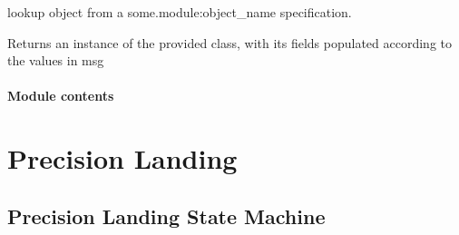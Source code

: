 \documentclass[letterpaper,10pt,english]{sphinxmanual}
\begin{document}

\begin{fulllineitems}
\label{\detokenize{source/mqtt_bridge/mqtt_bridge:mqtt_bridge.util.lookup_object}}
lookup object from a some.module:object\_name specification.

\end{fulllineitems}


\begin{fulllineitems}
\label{\detokenize{source/mqtt_bridge/mqtt_bridge:mqtt_bridge.util.populate_instance}}
Returns an instance of the provided class, with its fields populated
according to the values in msg

\end{fulllineitems}



\subsubsection{Module contents}
\label{\detokenize{source/mqtt_bridge/mqtt_bridge:module-mqtt_bridge}}\label{\detokenize{source/mqtt_bridge/mqtt_bridge:module-contents}}

\chapter{Precision Landing}
\label{\detokenize{source/precland:precision-landing}}\label{\detokenize{source/precland::doc}}

\section{Precision Landing State Machine}
\label{\detokenize{source/precland/precland_state_machine:precision-landing-state-machine}}\label{\detokenize{source/precland/precland_state_machine::doc}}
\end{document}
